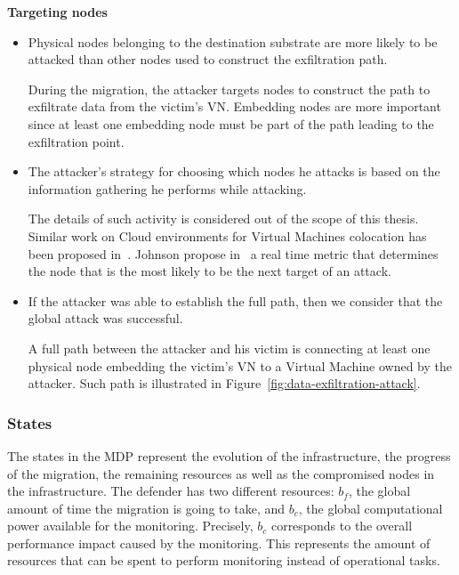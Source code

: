 \textbf{Targeting nodes}
\begin{itemize}
    \item  Physical nodes belonging to the destination substrate are more likely to be attacked than other nodes used to construct the exfiltration path. 
    
    During the migration, the attacker targets nodes to construct the path to exfiltrate data from the victim's VN.
    Embedding nodes are more important since at least one embedding node must be part of the path leading to the exfiltration point.
    
    \item The attacker's strategy for choosing which nodes he attacks is based on the information gathering he performs while attacking. 
    
    The details of such activity is considered out of the scope of this thesis.
    Similar work on Cloud environments for Virtual Machines colocation has been proposed in~\cite{getoffmucloud-Ristenpart2009, incentivemtd-Zhang2012}.
    Johnson \etal propose in~\cite{mitigateAPT-johnson2013} a real time metric that determines the node that is the most likely to be the next target of an attack.
    
    \item
    If the attacker was able to establish the full path, then we consider that the global attack was successful.
    
    A full path between the attacker and his victim is connecting at least one physical node embedding the victim's VN to a Virtual Machine owned by the attacker. Such path is illustrated in Figure~\ref{fig:data-exfiltration-attack}.
\end{itemize}



\subsubsection{States}
\label{sec:stateset}
The states in the MDP represent the evolution of the infrastructure, \ie the progress of the migration, the remaining resources as well as the compromised nodes in the infrastructure.
The defender has two different resources: $b_f$, the global amount of time the migration is going to take, and $b_c$, the global computational power available for the monitoring.
Precisely, $b_c$ corresponds to the overall performance impact caused by the monitoring. %
This represents the amount of resources that can be spent to perform monitoring instead of operational tasks.

